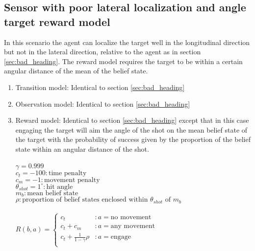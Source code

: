 \break
	
	\subsection{Sensor with poor lateral localization and angle target reward model \label{sec:beam_bad_heading}}
	In this scenario the agent can localize the target well in the longitudinal direction but not in the lateral direction, relative to the agent as in section \ref{sec:bad_heading}. The reward model requires the target to be within a certain angular distance of the mean of the belief state.
		\begin{enumerate}[label=(\alph*)]
		\item Transition model: Identical to section \ref{sec:bad_heading}
		\item Observation model: Identical to section \ref{sec:bad_heading}
		\item Reward model: Identical to section \ref{sec:bad_heading} except that in this case engaging the target will aim the angle of the shot on the mean belief state of the target with the probability of success given by the proportion of the belief state within an angular distance of the shot.\\\\
		$\gamma = 0.999$\\
		$c_t = -100 : \text{time penalty}$ \\
		$c_m = -1 : \text{movement penalty}$ \\
		$\theta_{shot} = 1^{\circ} : \text{hit angle}$\\
		$m_b : \text{mean belief state}$ \\
		$\rho : \text{proportion of belief states enclosed within } \theta_{shot} \text{ of } m_b $\\\\
		$
			 R(b,a) =
			  \begin{cases}
			   c_t & : a = \text{no movement} \\
			   c_t + c_m & : a = \text{any movement} \\
			   c_t + \frac{1}{1-\gamma}\rho & : a = \text{engage} \\
			  \end{cases}
			$
		\end{enumerate}
		

